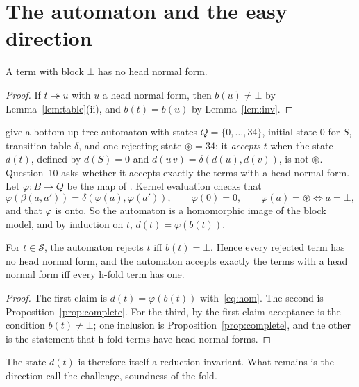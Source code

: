 \section{The automaton and the easy direction}\label{sec:q10}

\begin{proposition}[completeness]\label{prop:complete}
A term with block $\bot$ has no head normal form.
\end{proposition}
\begin{proof}
If $t\twoheadrightarrow u$ with $u$ a head normal form, then $b(u)\ne\bot$ by
Lemma~\ref{lem:table}(ii), and $b(t)=b(u)$ by Lemma~\ref{lem:inv}.
\end{proof}

\citet[Fig.~5.14]{dots} give a bottom-up tree automaton with states
$Q=\{0,\dots,34\}$, initial state $0$ for $S$, transition table $\delta$, and one
rejecting state $\circledast=34$; it \emph{accepts} $t$ when the state $d(t)$, defined by
$d(S)=0$ and $d(u\,v)=\delta(d(u),d(v))$, is not $\circledast$. Question~10 asks whether
it accepts exactly the terms with a head normal form. Let $\varphi\colon B\to Q$ be the map
of . Kernel evaluation checks that
\begin{equation}\label{eq:hom}
\varphi(\beta(a,a'))=\delta(\varphi(a),\varphi(a')),\qquad
\varphi(0)=0,\qquad
\varphi(a)=\circledast\iff a=\bot,
\end{equation}
and that $\varphi$ is onto. So the automaton is a homomorphic image of the block model,
and by induction on $t$, $d(t)=\varphi(b(t))$.

\begin{corollary}\label{cor:q10}
For $t\in\mathcal S$, the automaton rejects $t$ iff $b(t)=\bot$. Hence every rejected
term has no head normal form, and the automaton accepts exactly the terms with a head
normal form iff every h-fold term has one.
\end{corollary}
\begin{proof}
The first claim is $d(t)=\varphi(b(t))$ with~\eqref{eq:hom}. The second is
Proposition~\ref{prop:complete}. For the third, by the first claim acceptance is the
condition $b(t)\ne\bot$; one inclusion is Proposition~\ref{prop:complete}, and the other
is the statement that h-fold terms have head normal forms.
\end{proof}

The state $d(t)$ is therefore itself a reduction invariant. What remains is the direction
\citet{dots} call the challenge, soundness of the fold.
